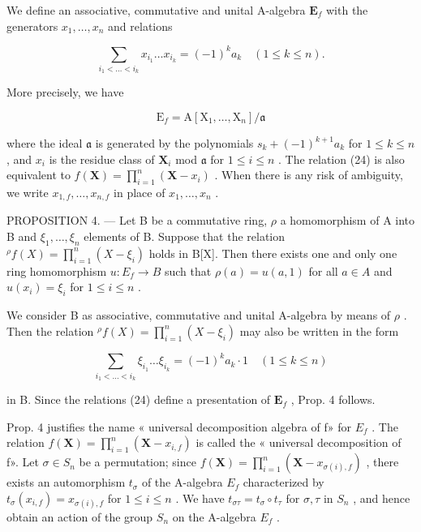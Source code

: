 We define an associative, commutative and unital A-algebra \(\mathbf{E}_f\) with the generators \(x_{1},\ldots ,x_{n}\) and relations

\[
\sum_ {i _ {1} <   \dots <   i _ {k}} x _ {i _ {1}} \dots x _ {i _ {k}} = (- 1) ^ {k} a _ {k} \quad (1 \leqslant k \leqslant n).\tag{24}
\]

More precisely, we have

\[
\mathrm{E} _ {f} = \mathrm{A} [ \mathrm{X} _ {1}, \dots , \mathrm{X} _ {n} ] / \mathfrak {a}
\]

where the ideal \(\mathfrak{a}\) is generated by the polynomials \(s_k + (-1)^{k+1} a_k\) for \(1 \leqslant k \leqslant n\) , and \(x_i\) is the residue class of \(\mathbf{X}_i\) mod \(\mathfrak{a}\) for \(1 \leqslant i \leqslant n\) . The relation (24) is also equivalent to \(f(\mathbf{X}) = \prod_{i=1}^{n} (\mathbf{X} - x_i)\) . When there is any risk of ambiguity, we write \(x_{1,f}, \ldots, x_{n,f}\) in place of \(x_1, \ldots, x_n\) .

PROPOSITION 4. --- Let B be a commutative ring, \(\rho\) a homomorphism of A into B and \(\xi_1, \ldots, \xi_n\) elements of B. Suppose that the relation \( {}^{\rho}f(X) = \prod_{i=1}^{n}(X - \xi_i)\) holds in B{[}X{]}. Then there exists one and only one ring homomorphism \(u: E_f \to B\) such that \(\rho(a) = u(a, 1)\) for all \(a \in A\) and \(u(x_i) = \xi_i\) for \(1 \leqslant i \leqslant n\) .

We consider B as associative, commutative and unital A-algebra by means of \(\rho\) . Then the relation \({}^{\rho}f(X) = \prod_{i=1}^{n}(X - \xi_i)\) may also be written in the form

\[
\sum_ {i _ {1} <   \dots <   i _ {k}} \xi_ {i _ {1}} \dots \xi_ {i _ {k}} = (- 1) ^ {k} a _ {k} \cdot 1 \quad (1 \leqslant k \leqslant n)
\]

in B. Since the relations (24) define a presentation of \(\mathbf{E}_f\) , Prop. 4 follows.

Prop. 4 justifies the name « universal decomposition algebra of f» for \(E_{f}\) . The relation \(f(\mathbf{X}) = \prod_{i=1}^{n} (\mathbf{X} - x_{i,f})\) is called the « universal decomposition of f». Let \(\sigma \in S_{n}\) be a permutation; since \(f(\mathbf{X}) = \prod_{i=1}^{n} (\mathbf{X} - x_{\sigma(i),f})\) , there exists an automorphism \(t_{\sigma}\) of the A-algebra \(E_{f}\) characterized by \(t_{\sigma}(x_{i,f}) = x_{\sigma(i),f}\) for \(1 \leqslant i \leqslant n\) . We have \(t_{\sigma\tau} = t_{\sigma} \circ t_{\tau}\) for \(\sigma, \tau\) in \(S_{n}\) , and hence obtain an action of the group \(S_{n}\) on the A-algebra \(E_{f}\) .

